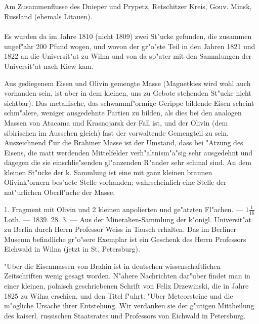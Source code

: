 \documentclass[a4paper, 11pt, oneside, polutonikogreek, german]{article}
\begin{document}
\subsection{}
\begin{center}

Am Zusammenflusse des Dnieper und Prypetz, Retschitzer Kreis, Gouv. Minsk, Russland (ehemals Litauen).
\end{center}
\paragraph{}
Es wurden da im Jahre 1810 (nicht 1809) zwei St"ucke gefunden, die zusammen ungef"ahr 200 Pfund wogen, und wovon der gr"o"ste Teil in den Jahren 1821 und 1822 an die Universit"at zu Wilna und von da sp"ater mit den Sammlungen der Universit"at nach Kiew kam.

Aus gediegenem Eisen und Olivin gemengte Masse (Magnetkies wird wohl auch vorhanden sein, ist aber in dem kleinen, uns zu Gebote stehenden St"ucke nicht sichtbar). Das metallische, das schwammf"ormige Gerippe bildende Eisen scheint schm"alere, weniger ausgedehnte Partien zu bilden, als dies bei den analogen Massen von Atacama und Krasnojarsk der Fall ist, und der Olivin (dem sibirischen im Aussehen gleich) fast der vorwaltende Gemengteil zu sein. Auszeichnend f"ur die Brahiner Masse ist der Umstand, dass bei "Atzung des Eisens, die matt werdenden Mittelfelder verh"altnism"a"sig sehr ausgedehnt und dagegen die sie einschlie"senden gl"anzenden R"ander sehr schmal sind. An dem kleinen St"ucke der k. Sammlung ist eine mit ganz kleinen braunen Olivink"ornern bes"aete Stelle vorhanden; wahrscheinlich eine Stelle der nat"urlichen Oberfl"ache der Masse.

1. Fragment mit Olivin und 2 kleinen anpolierten und ge"atzten Fl"achen. --- $1\frac{1}{16}$ Loth. --- 1839. 28. 3. --- Aus der Mineralien-Sammlung der k"onigl. Universit"at zu Berlin durch Herrn Professor Weiss in Tausch erhalten. Das im Berliner Museum befindliche gr"o"sere Exemplar ist ein Geschenk des Herrn Professors Eichwald in Wilna (jetzt in St. Petersburg).

\setlength{\leftskip}{10mm}
\setlength{\parindent}{0pt}

{\footnotesize "Uber die Eisenmassen von Brahin ist in deutschen wissenschaftlichen Zeitschriften wenig gesagt worden. N"ahere Nachrichten dar"uber findet man in einer kleinen, polnisch geschriebenen Schrift von Felix Drzewinski, die in Jahre 1825 zu Wilna erschien, und den Titel f"uhrt: "Uber Meteorsteine und die m"ogliche Ursache ihrer Entstehung. Wir verdanken sie der g"utigen Mittheilung des kaiserl. russischen Staatsrates und Professors von Eichwald in Petersburg.}
\end{document}
